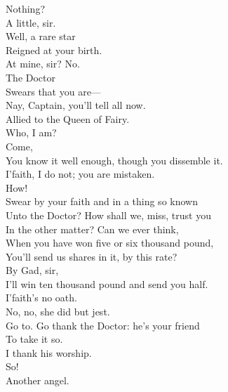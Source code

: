 \documentclass[a4paper,oneside,12pt]{memoir}
\begin{document}
\begin{drama*}
\facespeaks Nothing?\\
\dapperspeaks {} A little, sir.\\
\facespeaks {} Well, a rare star\\
Reigned at your birth.\\
\dapperspeaks {} At mine, sir? No.\\
\facespeaks {} The Doctor\\
Swears that you are---\\
\subtlespeaks {} Nay, Captain, you'll tell all now.\\
\facespeaks Allied to the Queen of Fairy.\\
\dapperspeaks {} Who, I am?\\
\facespeaks {} Come,\\
You know it well enough, though you dissemble it.\\
\dapperspeaks I'faith, I do not; you are mistaken.\\
\facespeaks {} How!\\
Swear by your faith and in a thing so known\\
Unto the Doctor? How shall we, miss, trust you\\
In the other matter? Can we ever think,\\
When you have won five or six thousand pound,\\
You'll send us shares in it, by this rate?\\
\dapperspeaks {} By Gad, sir,\\
I'll win ten thousand pound and send you half.\\
I'faith's no oath.\\
\subtlespeaks {} No, no, she did but jest.\\
\facespeaks Go to. Go thank the Doctor: he's your friend\\
To take it so.\\
\dapperspeaks {} I thank his worship.\\
\facespeaks {} So!\\
Another angel.\\

\end{drama*}
\end{document}
